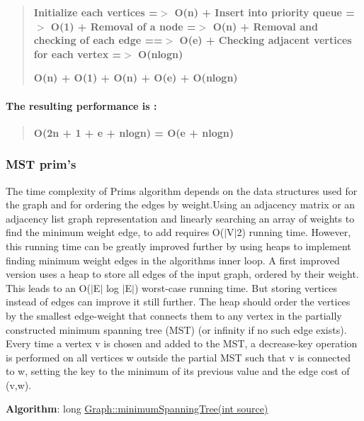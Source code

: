 \begin{quote}
{\bfseries Initialize each vertices =$>$ O(n) + Insert into priority queue =$>$ O(1) + Removal of a node =$>$ O(n) + Removal and checking of each edge ==$>$ O(e) + Checking adjacent vertices for each vertex =$>$ O(nlogn)}

{\bfseries O(n) + O(1) + O(n) + O(e) + O(nlogn)} \end{quote}


\paragraph*{The resulting performance is \+:}

\begin{quote}
{\bfseries O(2n + 1 + e + nlogn) = O(e + nlogn)} \end{quote}


\subsubsection*{M\+ST prim’s}





The time complexity of Prim\textquotesingle{}s algorithm depends on the data structures used for the graph and for ordering the edges by weight.\+Using an adjacency matrix or an adjacency list graph representation and linearly searching an array of weights to find the minimum weight edge, to add requires O($\vert$\+V$\vert$2) running time. However, this running time can be greatly improved further by using heaps to implement finding minimum weight edges in the algorithm\textquotesingle{}s inner loop. A first improved version uses a heap to store all edges of the input graph, ordered by their weight. This leads to an O($\vert$\+E$\vert$ log $\vert$\+E$\vert$) worst-\/case running time. But storing vertices instead of edges can improve it still further. The heap should order the vertices by the smallest edge-\/weight that connects them to any vertex in the partially constructed minimum spanning tree (M\+ST) (or infinity if no such edge exists). Every time a vertex v is chosen and added to the M\+ST, a decrease-\/key operation is performed on all vertices w outside the partial M\+ST such that v is connected to w, setting the key to the minimum of its previous value and the edge cost of (v,w).

{\bfseries Algorithm}\+: long \hyperlink{class_graph_ab3c693e0fce0a24e32893b750b0ca82f}{Graph\+::minimum\+Spanning\+Tree(int source)}

